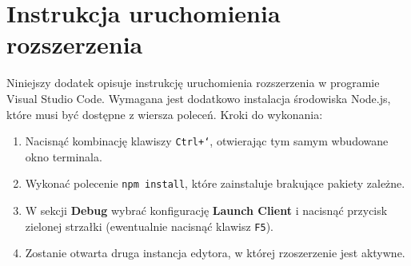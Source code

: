 \chapter{Instrukcja uruchomienia rozszerzenia}
Niniejszy dodatek opisuje instrukcję uruchomienia rozszerzenia w programie Visual Studio Code. Wymagana jest dodatkowo instalacja środowiska Node.js, które musi być dostępne z wiersza poleceń. Kroki do wykonania:

\begin{enumerate}
\item Nacisnąć kombinację klawiszy \texttt{Ctrl+`}, otwierając tym samym wbudowane okno terminala.
\item Wykonać polecenie \texttt{npm install}, które zainstaluje brakujące pakiety zależne.
\item W sekcji \textbf{Debug} wybrać konfigurację \textbf{Launch Client} i nacisnąć przycisk zielonej strzałki (ewentualnie nacisnąć klawisz \texttt{F5}).
\item Zostanie otwarta druga instancja edytora, w której rzoszerzenie jest aktywne.
\end{enumerate}